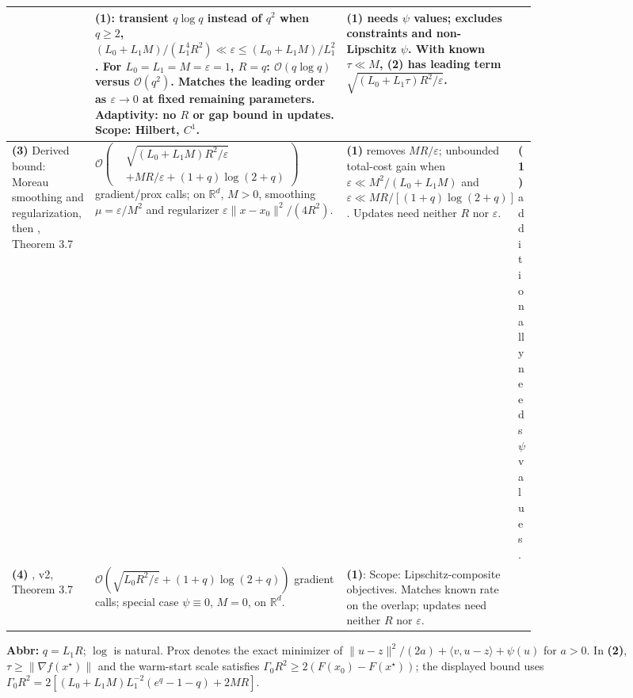 \begin{table}[tp]
\begin{threeparttable}
\begin{tabularx}{\linewidth}{@{}>{\raggedright\arraybackslash}p{0.20\linewidth}>{\raggedright\arraybackslash}p{0.32\linewidth}>{\raggedright\arraybackslash}p{0.25\linewidth}>{\raggedright\arraybackslash}X@{}}
& \textbf{(1)}: transient $q\log q$ instead of $q^2$ when $q\ge2$, $(L_0+L_1M)/(L_1^4R^2)\ll\varepsilon\le (L_0+L_1M)/L_1^2$. For $L_0=L_1=M=\varepsilon=1$, $R=q$: $\mathcal{O}(q\log q)$ versus $\mathcal{O}(q^2)$. Matches the leading order as $\varepsilon\to0$ at fixed remaining parameters. Adaptivity: no $R$ or gap bound in updates. Scope: Hilbert, $C^1$.
& \textbf{(1)} needs $\psi$ values; excludes constraints and non-Lipschitz $\psi$. With known $\tau\ll M$, \textbf{(2)} has leading term $\sqrt{(L_0+L_1\tau)R^2/\varepsilon}$. \\
\midrule
\textbf{(3)} Derived bound: Moreau smoothing and regularization, then \citep{mirrorEverestV2}, Theorem 3.7
& $\mathcal{O}\!\left(\begin{aligned}&\sqrt{(L_0+L_1M)R^2/\varepsilon}\\&+MR/\varepsilon+(1+q)\log(2+q)\end{aligned}\right)$ gradient/prox calls; on $\mathbb{R}^d$, $M>0$, smoothing $\mu=\varepsilon/M^2$ and regularizer $\varepsilon\|x-x_0\|^2/(4R^2)$.
& \textbf{(1)} removes $MR/\varepsilon$; unbounded total-cost gain when $\varepsilon\ll M^2/(L_0+L_1M)$ and $\varepsilon\ll MR/[(1+q)\log(2+q)]$. Updates need neither $R$ nor $\varepsilon$.
& \textbf{(1)} additionally needs $\psi$ values. \\
\midrule
\textbf{(4)} \citep{mirrorEverestV2}, v2, Theorem 3.7
& $\mathcal{O}\!\left(\sqrt{L_0R^2/\varepsilon}+(1+q)\log(2+q)\right)$ gradient calls; special case $\psi\equiv0$, $M=0$, on $\mathbb{R}^d$.
& \textbf{(1)}: Scope: Lipschitz-composite objectives. Matches known rate on the overlap; updates need neither $R$ nor $\varepsilon$.
& \\
\bottomrule
\end{tabularx}
\begin{tablenotes}[flushleft]\footnotesize
\item[] \textbf{Abbr:} $q=L_1R$; $\log$ is natural. Prox denotes the exact minimizer of $\|u-z\|^2/(2a)+\langle v,u-z\rangle+\psi(u)$ for $a>0$. In \textbf{(2)}, $\tau\ge\|\nabla f(x^\star)\|$ and the warm-start scale satisfies $\Gamma_0R^2\ge2(F(x_0)-F(x^\star))$; the displayed bound uses $\Gamma_0R^2=2[(L_0+L_1M)L_1^{-2}(e^q-1-q)+2MR]$.
\end{tablenotes}
\end{threeparttable}
\end{table}
\clearpage
